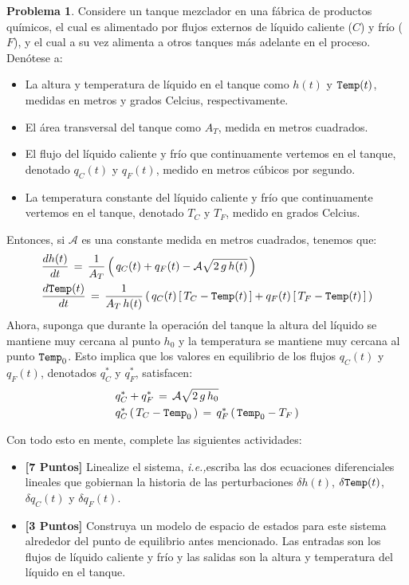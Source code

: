 \documentclass[ a4paper, twoside, 11pt]{article}
\newcommand{\ie}{\textit{i.e.,\;}}
\theoremstyle{definition}
\newtheorem{problem}[definition]{Problema}
\begin{document}
\begin{problem} Considere un tanque mezclador en una f\'abrica de productos qu\'imicos, \linebreak el cual es alimentado por flujos externos de l\'iquido caliente ($C$) y fr\'io ($F$), y el cual a su vez alimenta a otros tanques m\'as adelante en el proceso. Den\'otese a: 
\begin{itemize}
\item La altura y temperatura de l\'iquido en el tanque como $h(t)$ y ${\tt Temp}(t)$, medidas en metros y grados Celcius, respectivamente. 
\item El \'area transversal del tanque como $A_T$, medida en metros cuadrados. 
\item El flujo del l\'iquido caliente y fr\'io que continuamente vertemos en el tanque, denotado $q_C(t)$ y $q_F(t)$, medido en metros c\'ubicos por segundo. 
\item La temperatura constante del l\'iquido caliente y fr\'io que continuamente vertemos en \linebreak el tanque, denotado $T_C$ y $T_F$, medido en grados Celcius. 
\end{itemize}

Entonces, si $\mathcal{A}$ es una constante medida en metros cuadrados, tenemos que: 
\begin{align*}
& \frac{dh(t)}{dt} \, = \, \frac{1}{A_T} \left( \,
q_C(t) + q_F(t) - \mathcal{A} \sqrt{2 \, g \, h(t)} \,
\right) \\
& \frac{d {\tt Temp}(t)}{dt} \, = \, \frac{1}{A_T \, h(t)} \left( \, q_C(t) \, [ \, T_C - {\tt Temp}(t) \, ] + q_F(t) \, [ \, T_F - {\tt Temp}(t) \, ] \, \right)
\end{align*}
Ahora, suponga que durante la operaci\'on del tanque la altura del l\'iquido se mantiene muy cercana al punto $h_0$ y la temperatura se mantiene muy cercana al punto ${\tt Temp}_0$. Esto implica que los valores en equilibrio de los flujos $q_C(t)$ y $q_F(t)$, denotados $q_C^*$ y $q_F^*$, satisfacen: 
\begin{align*}
& q_C^* + q_F^* \, = \, \mathcal{A} \sqrt{ 2 \, g \, h_0 } \\
& q_C^* \, ( \, T_C - {\tt Temp}_0 \, ) \, = \, 
q_F^* \, ( \, {\tt Temp}_0 - T_F \, )
\end{align*}

Con todo esto en mente, complete las siguientes actividades: 
\begin{itemize}
\item \textbf{[7 Puntos]} Linealize el sistema, \ie escriba las dos ecuaciones diferenciales lineales que gobiernan la historia de las perturbaciones $\delta h(t)$, $\delta {\tt Temp}(t)$, $\delta q_C(t)$ y $\delta q_F(t)$. 
\item \textbf{[3 Puntos]} Construya un modelo de espacio de estados para este sistema alrededor del punto de equilibrio antes mencionado. Las entradas son los flujos de l\'iquido caliente y fr\'io y las salidas son la altura y temperatura del l\'iquido en el tanque. 
\end{itemize}

\end{problem}
\vspace{\baselineskip}
\end{document}
